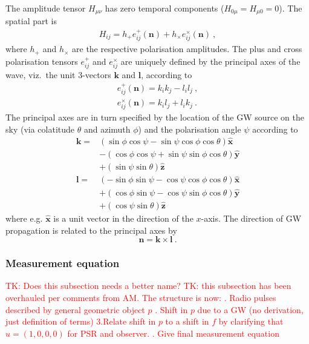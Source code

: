 \documentclass[fleqn,usenatbib,useAMS]{mnras}
\begin{document}
The amplitude tensor $H_{\mu \nu}$ has zero temporal components ($H_{0 \mu} = H_{\mu 0} = 0$). The spatial part is
\begin{align}
	H_{ij} = h_+ e_{ij}^+(\boldsymbol{n}) + h_{\times} e_{ij}^{\times}(\boldsymbol{n}) \ ,
\end{align}
where $h_{+}$ and $h_{\times}$ are the respective polarisation amplitudes. The plus and cross polarisation tensors $e_{ij}^{+}$ and $e_{ij}^{\times}$ are uniquely defined by the principal axes of the wave, viz.\ the unit 3-vectors $\boldsymbol{k}$ and $\boldsymbol{l}$, according to
\begin{align}
	e_{i j}^{+}(\boldsymbol{n}) =k_i k_j-l_i l_j \ , \\
		e_{i j}^{\times}(\boldsymbol{n}) =k_i l_j+l_i k_j \ .
\end{align}
The principal axes are in turn specified by the location of the GW source on the sky (via colatitude $\theta$ and azimuth $\phi$) and the polarisation angle $\psi$ according to
\begin{align}
	\boldsymbol{k}  = &(\sin \phi \cos \psi-\sin \psi \cos \phi \cos \theta) \boldsymbol{\hat{x}} \nonumber \\
	& -(\cos \phi \cos \psi+\sin \psi \sin \phi \cos \theta) \boldsymbol{\hat{y}} \nonumber \\
	& +(\sin \psi \sin \theta) \boldsymbol{\hat{z}} \\
	\boldsymbol{l} = &(-\sin \phi \sin \psi-\cos \psi \cos \phi \cos \theta) \boldsymbol{\hat{x}} \nonumber \\
	& +(\cos \phi \sin \psi-\cos \psi \sin \phi \cos \theta) \boldsymbol{\hat{y}}\nonumber  \\
	& +(\cos \psi \sin \theta) \boldsymbol{\hat{z}}
\end{align}
where e.g. $\boldsymbol{\hat{x}}$ is a unit vector in the direction of the $x$-axis. The direction of GW propagation is related to the principal axes by
\begin{equation}
	\boldsymbol{n} = \boldsymbol{k} \times \boldsymbol{l} \ . 
\end{equation}




\subsubsection{Measurement equation}
\textcolor{red}{TK: Does this subsection needs a better name?} \newline 
\noindent \textcolor{red}{TK: this subsection has been overhauled per comments from AM. The structure is now: . Radio pulses described by general geometric object $p$ . Shift in $p$ due to a GW (no derivation, just definition of terms) \newline 3.Relate shift in $p$ to a shift in $f$ by clarifying that $u=(1,0,0,0)$ for PSR and observer. . Give final measurement equation} \newline 
\end{document}
